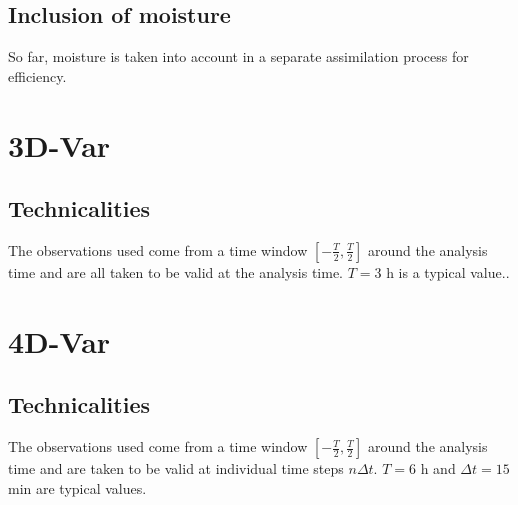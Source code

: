 \documentclass{report}
\begin{document}
\section{Inclusion of moisture}
\label{sec:inclusion_of_moisture}

So far, moisture is taken into account in a separate assimilation process for efficiency.

\chapter{3D-Var}
\label{chap:3d-var}

\section{Technicalities}
\label{sec:technicalities_3d-var}

The observations used come from a time window $\left[-\frac{T}{2}, \frac{T}{2}\right]$ around the analysis time and are all taken to be valid at the analysis time. $T = 3$ h is a typical value..

\chapter{4D-Var}
\label{chap:4d-var}
%

\section{Technicalities}
\label{sec:technicalities_4d-var}

The observations used come from a time window $\left[-\frac{T}{2}, \frac{T}{2}\right]$ around the analysis time and are taken to be valid at individual time steps $n\Delta t$. $T = 6$ h and $\Delta t = 15$ min are typical values.

\appendix

\printbibliography
\end{document}
